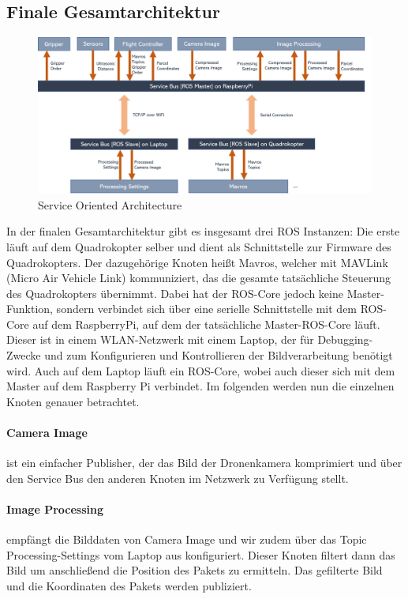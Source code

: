 \pagebreak
\subsection{Finale Gesamtarchitektur}
\begin{figure}[h]
	\centering
	\includegraphics[scale=0.51]{"Grafiken/gesamtarchitektur.png"}
	\caption{Service Oriented Architecture}
	\label{fig:meine-grafik}
\end{figure}
In der finalen Gesamtarchitektur gibt es insgesamt drei ROS Instanzen: Die erste läuft auf dem Quadrokopter selber und dient als Schnittstelle zur Firmware des Quadrokopters. Der dazugehörige Knoten heißt Mavros, welcher mit MAVLink (Micro Air Vehicle Link) kommuniziert, das die gesamte tatsächliche Steuerung des Quadrokopters übernimmt. Dabei hat der ROS-Core jedoch keine Master-Funktion, sondern verbindet sich über eine serielle Schnittstelle mit dem ROS-Core auf dem RaspberryPi, auf dem der tatsächliche Master-ROS-Core läuft. Dieser ist in einem WLAN-Netzwerk mit einem Laptop, der für Debugging-Zwecke und zum Konfigurieren und Kontrollieren der Bildverarbeitung benötigt wird. Auch auf dem Laptop läuft ein ROS-Core, wobei auch dieser sich mit dem Master auf dem Raspberry Pi verbindet. Im folgenden werden nun die einzelnen Knoten genauer betrachtet.
\paragraph{Camera Image} ist ein einfacher Publisher, der das Bild der Dronenkamera komprimiert und über den Service Bus den anderen Knoten im Netzwerk zu Verfügung stellt.
\paragraph{Image Processing} empfängt die Bilddaten von Camera Image und wir zudem über das Topic Processing-Settings vom Laptop aus konfiguriert. Dieser Knoten filtert dann das Bild um anschließend die Position des Pakets zu ermitteln. Das gefilterte Bild und die Koordinaten des Pakets werden publiziert. 
